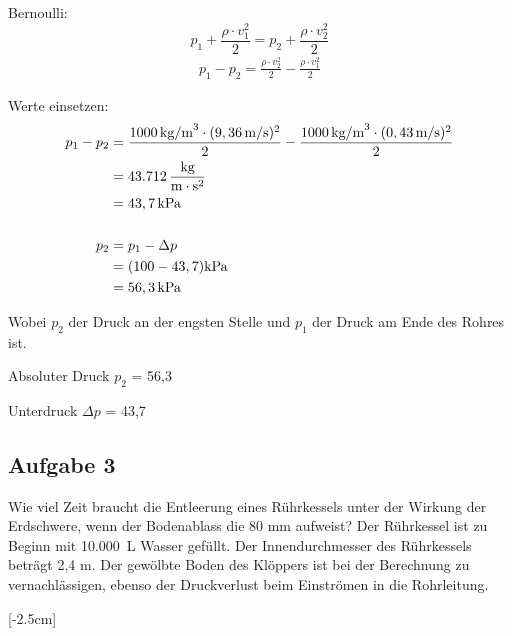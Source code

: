 \documentclass[a4paper,11pt]{article}
\begin{document}
\begin{marginfigure}[+2cm]
Bernoulli:
\begin{equation}
p_1 + \frac{\rho \cdot v_1^2}{2} = p_2 + \frac{\rho \cdot v_2^2}{2}
\end{equation}
\begin{align*}
p_1 - p_2 = \frac{\rho \cdot v_2^2}{2} -  \frac{\rho \cdot v_1^2}{2} 
\end{align*}

\pp



Werte einsetzen: 
\begin{align*}
p_1 - p_2 &= \frac{1000 \mskip3mu \text{kg/m}^3 \cdot (9,36\mskip3mu \text{m/s} )^2}{2} -  \frac{1000 \mskip3mu \text{kg/m}^3 \cdot (0,43 \mskip3mu \text{m/s} )^2}{2} \\
&= 43.712 \mskip3mu \frac{\text{kg}}{\text{m} \cdot \text{s}^2} \\
&= 43,7 \mskip3mu \text{kPa} \\ \\
p_2 &= p_1 - \Delta p \\
	&= (100 - 43,7)\text{kPa}\\ &= 56,3\mskip3mu \text{kPa}
\end{align*}

Wobei $p_2$ der Druck an der engsten Stelle und $p_1$ der Druck am Ende des Rohres ist.\par
Absoluter Druck $p_2$ = 56,3  \par 
Unterdruck $\Delta p$ = 43,7  \par 

\pagebreak
 
 


\subsection*{Aufgabe 3}
Wie viel Zeit braucht die Entleerung eines Rührkessels unter der Wirkung der \mbox{Erdschwere}, wenn der Bodenablass die  80 mm aufweist? Der Rührkessel ist zu Beginn mit \mbox{10.000 L} Wasser gefüllt. Der Innendurchmesser des Rührkessels beträgt 2,4 m. Der gewölbte Boden des Klöppers ist bei der Berechnung zu vernachlässigen, ebenso der Druckverlust beim Einströmen in die Rohrleitung.




[-2.5cm]


\end{marginfigure}
\end{document}
